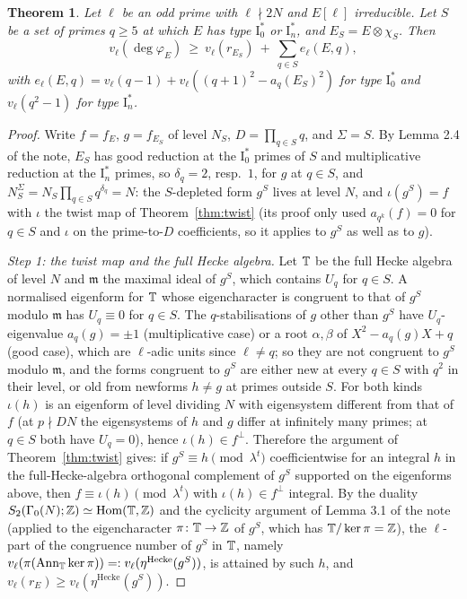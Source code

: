 \documentclass[11pt]{amsart}
\newtheorem{theorem}{Theorem}[section]
\theoremstyle{definition}
\newcommand{\degphi}{\deg\varphi_E}\newcommand{\Gal}{\operatorname{Gal}}\newcommand{\ad}{\operatorname{ad}^0}
\begin{document}
\begin{theorem}\label{thm:euler}
Let $\ell$ be an odd prime with $\ell\nmid 2N$ and $E[\ell]$ irreducible. Let $S$ be a set of primes $q\ge5$ at which $E$ has type $\mathrm{I}_0^*$ or $\mathrm{I}_n^*$, and $E_S=E\otimes\chi_S$. Then
\[
v_\ell(\degphi)\ \ge\ v_\ell(r_{E_S})\ +\ \sum_{q\in S}e_\ell(E,q),
\]
with $e_\ell(E,q)=v_\ell(q-1)+v_\ell((q+1)^2-a_q(E_S)^2)$ for type $\mathrm{I}_0^*$ and $v_\ell(q^2-1)$ for type $\mathrm{I}_n^*$.
\end{theorem}

\begin{proof}
Write $f=f_E$, $g=f_{E_S}$ of level $N_S$, $D=\prod_{q\in S}q$, and $\Sigma=S$. By Lemma 2.4 of the note, $E_S$ has good reduction at the $\mathrm{I}_0^*$ primes of $S$ and multiplicative reduction at the $\mathrm{I}_n^*$ primes, so $\delta_q=2$, resp.\ $1$, for $g$ at $q\in S$, and $N_S^\Sigma=N_S\prod_{q\in S}q^{\delta_q}=N$: the $S$-depleted form $g^S$ lives at level $N$, and $\iota(g^S)=f$ with $\iota$ the twist map of Theorem~\ref{thm:twist} (its proof only used $a_{q^k}(f)=0$ for $q\in S$ and $\iota$ on the prime-to-$D$ coefficients, so it applies to $g^S$ as well as to $g$).

\emph{Step 1: the twist map and the full Hecke algebra.} Let $\mathbb{T}$ be the full Hecke algebra of level $N$ and $\mathfrak{m}$ the maximal ideal of $g^S$, which contains $U_q$ for $q\in S$. A normalised eigenform for $\mathbb{T}$ whose eigencharacter is congruent to that of $g^S$ modulo $\mathfrak m$ has $U_q\equiv0$ for $q\in S$. The $q$-stabilisations of $g$ other than $g^S$ have $U_q$-eigenvalue $a_q(g)=\pm1$ (multiplicative case) or a root $\alpha,\beta$ of $X^2-a_q(g)X+q$ (good case), which are $\ell$-adic units since $\ell\ne q$; so they are not congruent to $g^S$ modulo $\mathfrak m$, and the forms congruent to $g^S$ are either new at every $q\in S$ with $q^2$ in their level, or old from newforms $h\neq g$ at primes outside $S$. For both kinds $\iota(h)$ is an eigenform of level dividing $N$ with eigensystem different from that of $f$ (at $p\nmid DN$ the eigensystems of $h$ and $g$ differ at infinitely many primes; at $q\in S$ both have $U_q=0$), hence $\iota(h)\in f^\perp$. Therefore the argument of Theorem~\ref{thm:twist} gives: if $g^S\equiv h\pmod{\lambda^t}$ coefficientwise for an integral $h$ in the full-Hecke-algebra orthogonal complement of $g^S$ supported on the eigenforms above, then $f\equiv\iota(h)\pmod{\lambda^t}$ with $\iota(h)\in f^\perp$ integral. By the duality $S_2(\Gamma_0(N);\mathbb{Z})\simeq\operatorname{Hom}(\mathbb{T},\mathbb{Z})$ and the cyclicity argument of Lemma 3.1 of the note (applied to the eigencharacter $\pi\colon\mathbb{T}\to\mathbb{Z}$ of $g^S$, which has $\mathbb{T}/\ker\pi=\mathbb{Z}$), the $\ell$-part of the congruence number of $g^S$ in $\mathbb{T}$, namely $v_\ell(\pi(\operatorname{Ann}_{\mathbb{T}}\ker\pi))=:v_\ell(\eta^{\mathrm{Hecke}}(g^S))$, is attained by such $h$, and $v_\ell(r_E)\ge v_\ell(\eta^{\mathrm{Hecke}}(g^S))$.


\end{proof}
\end{document}

